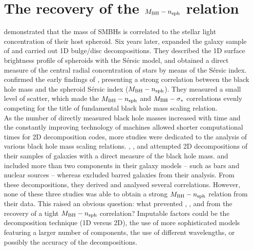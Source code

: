 \chapter{The recovery of the $M_{\rm BH} - n_{\rm sph}$ relation}
\label{ch:recov-mn}

\cite{graham2001} demonstrated that the mass of SMBHs is correlated 
to the stellar light concentration of their host spheroid. 
Six years later, \cite{grahamdriver2007} expanded the galaxy sample of \cite{graham2001} 
and carried out 1D bulge/disc decompositions. 
They described the 1D surface brightness profile of spheroids with the S\'ersic model, 
and obtained a direct measure of the central radial concentration of stars 
by means of the S\'ersic index. 
\cite{grahamdriver2007} confirmed the early findings of \cite{graham2001}, 
presenting a strong correlation between the black hole mass and the spheroid S\'ersic index ($M_{\rm BH} - n_{\rm sph}$). 
They measured a small level of scatter, 
which made the $M_{\rm BH} - n_{\rm sph}$ and $M_{\rm BH} - \sigma_*$ correlations 
evenly competing for the title of fundamental black hole mass scaling relation. \\

As the number of directly measured black hole masses increased with time and
the constantly improving technology of machines allowed shorter computational times for 2D decomposition codes, 
more studies were dedicated to the analysis of various black hole mass scaling relations. 
\cite{sani2011}, \cite{vika2012}, and \cite{beifiori2012} attempted 2D decompositions 
of their samples of galaxies with a direct measure of the black hole mass. 
\citeauthor{sani2011} and \citeauthor{vika2012} included more than two components in their galaxy models 
-- such as bars and nuclear sources -- 
whereas \citeauthor{beifiori2012} excluded barred galaxies from their analysis. 
From these decompositions, they derived and analysed several correlations. 
However, none of these three studies was able to obtain a strong $M_{\rm BH} - n_{\rm sph}$ relation from their data. 
This raised an obvious question: 
what prevented \citeauthor{sani2011}, \citeauthor{vika2012}, and \citeauthor{beifiori2012} 
from the recovery of a tight $M_{\rm BH} - n_{\rm sph}$ correlation? 
Imputable factors could be the decomposition technique (1D versus 2D), 
the use of more sophisticated models featuring a larger number of components, 
the use of different wavelengths, 
or possibly the accuracy of the decompositions. \\

